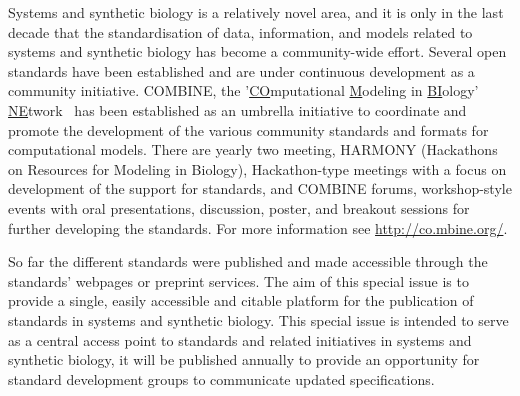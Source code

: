 \documentclass{jib}
\begin{document}
Systems and synthetic biology is a relatively novel area, and it is only in the last decade that the standardisation of data, information, and models related to systems and synthetic biology has  become a community-wide effort. 
Several open standards have been established and are under continuous development as a community initiative. 
COMBINE, the '\underline{CO}mputational \underline{M}odeling in \underline{BI}ology' \underline{NE}twork~\cite{hucka2015promoting} has been established as an umbrella  initiative to coordinate and promote the development of the various community standards and formats for computational models. 
There are yearly two meeting, HARMONY (Hackathons on Resources for Modeling in Biology), Hackathon-type meetings with a focus on development of the support for standards, and COMBINE forums, workshop-style events with oral presentations, discussion, poster, and breakout sessions for  further developing the standards. 
For more information see \url{http://co.mbine.org/}. 

So far the different standards were published and made accessible through the standards' webpages or preprint services. 
The aim of this special issue is to provide a single, easily accessible and citable platform for the publication of standards in systems and synthetic biology. 
This special issue is intended to serve as a central access point to standards and related initiatives in systems and synthetic biology, it will be published annually to provide an opportunity for standard development groups to communicate updated specifications.
\end{document}
